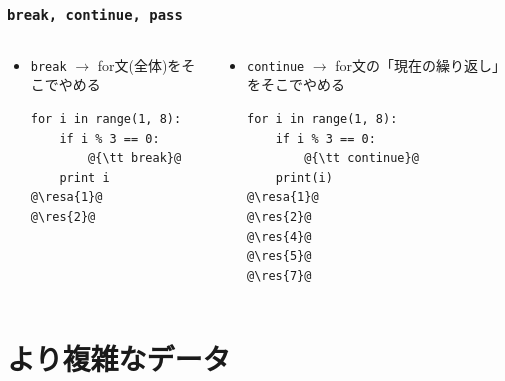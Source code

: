 \documentclass[10pt,dvipdfmx]{beamer}
\newcommand{\ore}[1]{{\color{orange}#1}}
\newcommand{\resa}[1]{\ore{\textsl{$\rightarrow$ #1}}}
\newcommand{\res}[1]{\ore{\textsl{#1}}}
\begin{document}
\begin{frame}[fragile]
\frametitle{{\tt break, continue, pass}}

\begin{columns}
\begin{column}{0.55\textwidth}
\begin{itemize}
\item {\tt break} $\rightarrow$ for文(全体)をそこでやめる
\begin{lstlisting}
for i in range(1, 8):
    if i % 3 == 0:
        @{\tt break}@
    print i
@\resa{1}@
@\res{2}@
\end{lstlisting}
\end{itemize}
\end{column}


\begin{column}{0.55\textwidth}
\begin{itemize}
\item {\tt continue} $\rightarrow$ for文の「現在の繰り返し」をそこでやめる
\begin{lstlisting}
for i in range(1, 8):
    if i % 3 == 0:
        @{\tt continue}@
    print(i)
@\resa{1}@
@\res{2}@
@\res{4}@
@\res{5}@
@\res{7}@
\end{lstlisting}
\end{itemize}

\end{column}
\end{columns}
\end{frame}



\section{より複雑なデータ}
\end{document}
